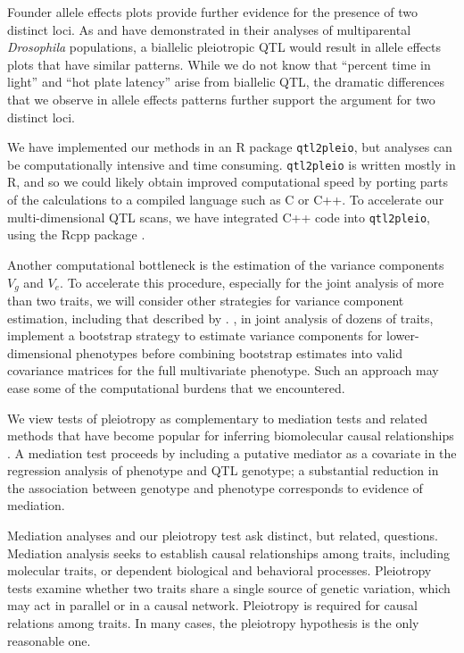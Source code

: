 \documentclass[oneside]{book}\usepackage[]{graphicx}\usepackage[]{color}
\begin{document}
Founder allele effects plots provide further evidence for the presence
of two distinct loci. As \citet{macdonald2007joint} and
\citet{king2012genetic} have demonstrated in their analyses of multiparental
\emph{Drosophila} populations, a biallelic pleiotropic QTL would result in
allele effects plots that have similar patterns. While we do not know
that ``percent time in light'' and ``hot plate latency'' arise from
biallelic QTL, the dramatic differences that we observe in allele
effects patterns further support the argument for two distinct loci.

We have implemented our methods in an R package
\texttt{qtl2pleio}, but analyses can be computationally intensive and
time consuming. \texttt{qtl2pleio} is written mostly in R, and so we
could likely obtain improved computational speed by porting parts of
the calculations to a compiled language such as C or C++.
To accelerate our multi-dimensional QTL
scans, we have integrated C++ code into \texttt{qtl2pleio},
using the Rcpp package \citep{eddelbuettel2011rcpp}.

Another computational bottleneck is the estimation of the variance
components $V_g$ and $V_e$. To accelerate this procedure,
especially for the joint analysis of more than two traits, we will
consider other strategies for variance component estimation, including
that described by \citet{hannah2018limmbo}. \citet{hannah2018limmbo}, in joint analysis of dozens of traits, implement a bootstrap
strategy to estimate variance components for lower-dimensional
phenotypes before combining bootstrap estimates
into valid covariance matrices for the full multivariate phenotype.
Such an approach may ease some of the computational burdens that we encountered.


We view tests of pleiotropy as complementary to
mediation tests and related methods that have become popular for
inferring biomolecular causal relationships
\citep{chick2016defining,schadt2005integrative,baron1986moderator}. A
mediation test proceeds by including a putative mediator as a
covariate in the regression analysis of phenotype and QTL genotype;
a substantial reduction in the association between
genotype and phenotype corresponds to evidence of mediation.


Mediation analyses and our pleiotropy test ask distinct, but related, questions. Mediation analysis seeks to establish causal relationships among traits, including molecular traits, or dependent biological and behavioral processes. Pleiotropy tests examine whether two traits share a single source of genetic variation, which may act in parallel or in a causal network. Pleiotropy is required for causal relations among traits. In many cases, the pleiotropy hypothesis is the only reasonable one.
\end{document}
